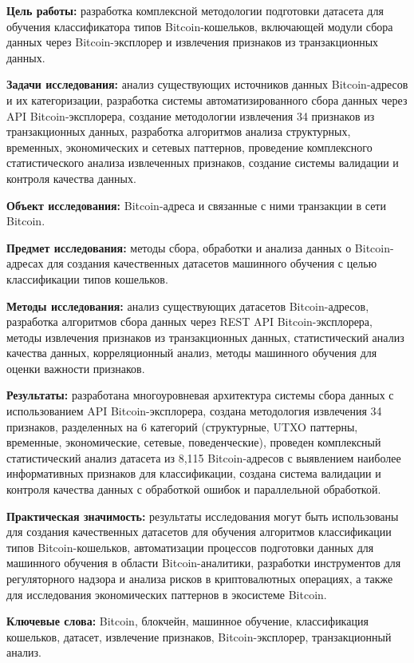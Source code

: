 \abstract %

\textbf{Цель работы:} разработка комплексной методологии подготовки датасета для обучения классификатора типов Bitcoin-кошельков, включающей модули сбора данных через Bitcoin-эксплорер и извлечения признаков из транзакционных данных.

\textbf{Задачи исследования:} анализ существующих источников данных Bitcoin-адресов и их категоризации, разработка системы автоматизированного сбора данных через API Bitcoin-эксплорера, создание методологии извлечения 34 признаков из транзакционных данных, разработка алгоритмов анализа структурных, временных, экономических и сетевых паттернов, проведение комплексного статистического анализа извлеченных признаков, создание системы валидации и контроля качества данных.

\textbf{Объект исследования:} Bitcoin-адреса и связанные с ними транзакции в сети Bitcoin.

\textbf{Предмет исследования:} методы сбора, обработки и анализа данных о Bitcoin-адресах для создания качественных датасетов машинного обучения с целью классификации типов кошельков.

\textbf{Методы исследования:} анализ существующих датасетов Bitcoin-адресов, разработка алгоритмов сбора данных через REST API Bitcoin-эксплорера, методы извлечения признаков из транзакционных данных, статистический анализ качества данных, корреляционный анализ, методы машинного обучения для оценки важности признаков.

\textbf{Результаты:} разработана многоуровневая архитектура системы сбора данных с использованием API Bitcoin-эксплорера, создана методология извлечения 34 признаков, разделенных на 6 категорий (структурные, UTXO паттерны, временные, экономические, сетевые, поведенческие), проведен комплексный статистический анализ датасета из 8,115 Bitcoin-адресов с выявлением наиболее информативных признаков для классификации, создана система валидации и контроля качества данных с обработкой ошибок и параллельной обработкой.

\textbf{Практическая значимость:} результаты исследования могут быть использованы для создания качественных датасетов для обучения алгоритмов классификации типов Bitcoin-кошельков, автоматизации процессов подготовки данных для машинного обучения в области Bitcoin-аналитики, разработки инструментов для регуляторного надзора и анализа рисков в криптовалютных операциях, а также для исследования экономических паттернов в экосистеме Bitcoin.

\textbf{Ключевые слова:} Bitcoin, блокчейн, машинное обучение, классификация кошельков, датасет, извлечение признаков, Bitcoin-эксплорер, транзакционный анализ.